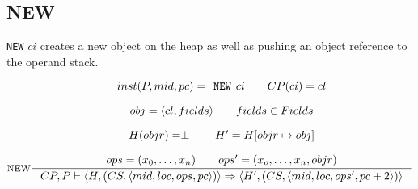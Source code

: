 \subsection{NEW}
\texttt{NEW} $ci$ creates a new object on the heap as well as pushing an object reference to the operand stack.

$$\inference[NEW]{
inst(P,mid, pc) = \texttt{NEW }ci \semsp
CP(ci) = cl \semnl \\
obj = \langle cl, fields \rangle \semsp
fields \in Fields \semnl \\
H(objr) = \perp \semsp
H' = H[objr \mapsto obj]  \semnl \\
ops = (x_0, \ldots, x_n) \semsp
ops' = (x_o, \ldots, x_n, objr)
}
{CP, P \vdash \langle H, (CS, \langle mid, loc, ops, pc \rangle )\rangle \Rightarrow \langle H', (CS, \langle mid, loc, ops', pc + 2 \rangle )\rangle}$$
